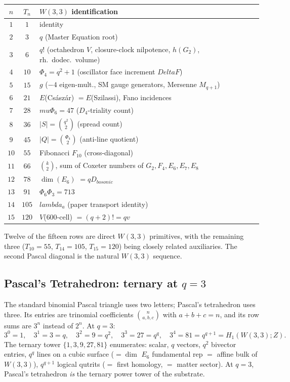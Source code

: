 \documentclass[11pt]{article}
\def\mathbb#1{#1}%
\def\textbf#1{#1}%
\def\text#1{#1}%
\def\Delta{Delta}%
\def\lambda{lambda}%
\def\mu{mu}%
\def\Phi#1{Phi#1}%
\def\cdot{ }%
\newcommand{\W}{W(3,3)}
\begin{document}
\begin{center}
\renewcommand{\arraystretch}{1.18}
\footnotesize
\begin{tabular}{c c l}
\toprule
$n$ & $T_n$ & $W(3,3)$ identification \\
\midrule
$1$ & $1$ & identity \\
$2$ & $3$ & $q$ (Master Equation root) \\
$3$ & $6$ & $q!$ (octahedron $V$, closure-clock nilpotence, $h(G_2)$, rh.\ dodec.\ volume) \\
$4$ & $10$ & $\Phi_4 = q^2 + 1$ (oscillator face increment $\Delta F$) \\
$5$ & $15$ & $g$ ($-4$ eigen-mult., SM gauge generators, Mersenne $M_{q+1}$) \\
$6$ & $21$ & $E$(Császár) $= E$(Szilassi), Fano incidences \\
$7$ & $28$ & $\mu \cdot \Phi_6 = 4\cdot 7$ ($D_4$-triality count) \\
$8$ & $36$ & $|S| = \binom{q^2}{2}$ (spread count) \\
$9$ & $45$ & $|Q| = \binom{\Phi_4}{2}$ (anti-line quotient) \\
$10$ & $55$ & Fibonacci $F_{10}$ (cross-diagonal) \\
$11$ & $66$ & $\binom{k}{2}$, sum of Coxeter numbers of $G_2, F_4, E_6, E_7, E_8$ \\
$12$ & $78$ & $\dim(E_6)$ $= q \cdot D_{\text{bosonic}}$ \\
$13$ & $91$ & $\Phi_6 \cdot \Phi_3 = 7\cdot 13$ \\
$14$ & $105$ & $\lambda_a$ (paper transport identity) \\
$15$ & $120$ & $V$($600$-cell) $= (q+2)! = q \cdot v$ \\
\bottomrule
\end{tabular}
\end{center}

Twelve of the fifteen rows are direct $W(3,3)$ primitives, with the remaining three ($T_{10}=55$, $T_{14}=105$, $T_{15}=120$) being closely related auxiliaries. \textbf{The second Pascal diagonal is the natural $W(3,3)$ sequence.}

\subsection*{Pascal's Tetrahedron: ternary at $q = 3$}

The standard binomial Pascal triangle uses two letters; \textbf{Pascal's tetrahedron} uses three. Its entries are trinomial coefficients $\binom{n}{a,b,c}$ with $a+b+c = n$, and its row sums are $3^n$ instead of $2^n$. At $q = 3$:
\[
3^0 = 1, \quad 3^1 = 3 = q, \quad 3^2 = 9 = q^2, \quad 3^3 = 27 = q^q, \quad 3^4 = 81 = q^{q+1} = H_1(\W; \mathbb{Z}).
\]
The ternary tower $\{1, 3, 9, 27, 81\}$ enumerates: scalar, $q$ vectors, $q^2$ bivector entries, $q^q$ lines on a cubic surface ($= \dim$ $E_6$ fundamental rep $=$ affine bulk of $W(3,3)$), $q^{q+1}$ logical qutrits ($=$ first homology, $=$ matter sector). At $q = 3$, Pascal's tetrahedron \emph{is} the ternary power tower of the substrate.
\end{document}

